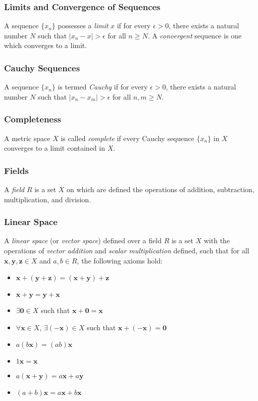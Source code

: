 \subsubsection*{Limits and Convergence of Sequences} A sequence $\{ x_n \}$ possesses a \textit{limit} $x$ if for every $\epsilon > 0$, there exists a natural number $N$ such that $|x_n - x| > \epsilon$ for all $n \geq N$. A \textit{convergent} sequence is one which converges to a limit.

\subsubsection*{Cauchy Sequences} A sequence $\{ x_n \}$ is termed \textit{Cauchy} if for every $\epsilon > 0$, there exists a natural number $N$ such that $|x_n - x_m| > \epsilon$ for all $n, m \geq N$. 

\subsubsection*{Completeness} A metric space $X$ is called \textit{complete} if every Cauchy sequence $\{x_n\}$ in $X$ converges to a limit contained in $X$.

\subsubsection*{Fields} A \textit{field} $R$ is a set $X$ on which are defined the operations of addition, subtraction, multiplication, and division.

\subsubsection*{Linear Space} A \textit{linear space} (or \textit{vector space}) defined over a field $R$ is a set $X$ with the operations of \textit{vector addition} and \textit{scalar multiplication} defined, such that for all $\mathbf{x}, \mathbf{y}, \mathbf{z} \in X$ and $a, b \in R$, the following axioms hold:
\begin{itemize}
  \item $\mathbf{x} + (\mathbf{y} + \mathbf{z}) = (\mathbf{x} + \mathbf{y}) + \mathbf{z}$
  \item $\mathbf{x} + \mathbf{y} = \mathbf{y} + \mathbf{x}$
  \item $\exists \mathbf{0} \in X$ such that $\mathbf{x} + \mathbf{0} = \mathbf{x}$
  \item $\forall \mathbf{x} \in X$, $\exists (-\mathbf{x}) \in X$ such that $\mathbf{x} + (-\mathbf{x}) = \mathbf{0}$
  \item $a(b\mathbf{x}) = (ab)\mathbf{x}$
  \item $1\mathbf{x} = \mathbf{x}$
  \item $a(\mathbf{x} + \mathbf{y}) = a\mathbf{x} + a\mathbf{y}$
  \item $(a+b)\mathbf{x} = a\mathbf{x} + b\mathbf{x}$
\end{itemize}

